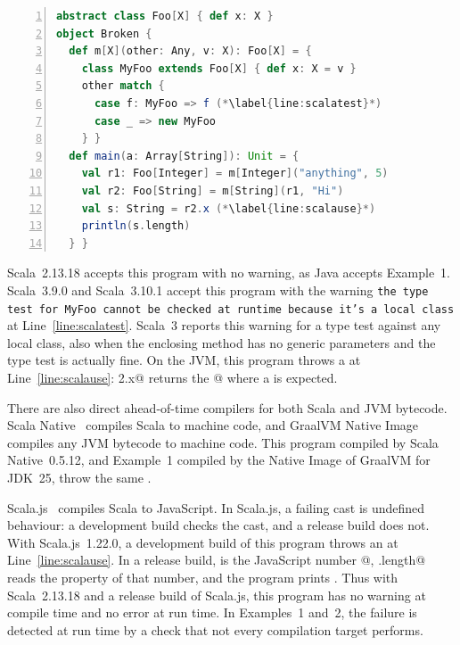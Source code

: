 \medskip\noindent\begin{minipage}{\linewidth}
\begin{lstlisting}[language=Scala,numbers=left,xleftmargin=2em]
abstract class Foo[X] { def x: X }
object Broken {
  def m[X](other: Any, v: X): Foo[X] = {
    class MyFoo extends Foo[X] { def x: X = v }
    other match {
      case f: MyFoo => f (*\label{line:scalatest}*)
      case _ => new MyFoo
    } }
  def main(a: Array[String]): Unit = {
    val r1: Foo[Integer] = m[Integer]("anything", 5)
    val r2: Foo[String] = m[String](r1, "Hi")
    val s: String = r2.x (*\label{line:scalause}*)
    println(s.length)
  } }
\end{lstlisting}
\end{minipage}

Scala~2.13.18 accepts this program with no warning, as Java accepts Example~1.
Scala~3.9.0 and Scala~3.10.1 accept this program with the warning \texttt{the type test for MyFoo cannot be checked at runtime because it's a local class} at Line~\ref{line:scalatest}.
Scala~3 reports this warning for a type test against any local class, also when the enclosing method has no generic parameters and the type test is actually fine.
On the JVM, this program throws a \Q@ClassCastException@ at Line~\ref{line:scalause}: \Q@r2.x@ returns the \Q@Integer@ {}@ where a \Q@String@ is expected.

There are also direct ahead-of-time compilers for both Scala and JVM bytecode.
Scala Native~\cite{shabalin2020} compiles Scala to machine code, and GraalVM Native Image~\cite{wimmer2019initialize} compiles any JVM bytecode to machine code.
This program compiled by Scala Native~0.5.12, and Example~1 compiled by the Native Image of GraalVM for JDK~25, throw the same \Q@ClassCastException@.

Scala.js~\cite{scalajs_semantics} compiles Scala to JavaScript.
In Scala.js, a failing cast is undefined behaviour: a development build checks the cast, and a release build does not.
With Scala.js~1.22.0, a development build of this program throws an \Q@UndefinedBehaviorError@ at Line~\ref{line:scalause}.
In a release build, \Q@s@ is the JavaScript number @, \Q@s.length@ reads the property \Q@length@ of that number, and the program prints \Q@undefined@.
Thus with Scala~2.13.18 and a release build of Scala.js, this program has no warning at compile time and no error at run time.
In Examples~1 and~2, the failure is detected at run time by a check that not every compilation target performs.

